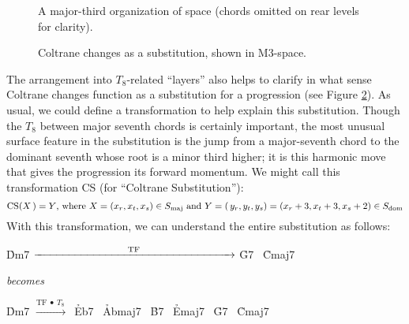 \begin{figure}[tbp]
  \caption[A major-third organization of \tf space.]{A major-third
    organization of \tf space (\ii chords omitted on rear levels for clarity).}
\label{maj3:maj3-space}
\end{figure}

\begin{figure}[tbp]
  \caption{Coltrane changes as a \tfo substitution, shown in M3-space.}
\label{maj3:coltrane-subs-space}
\end{figure}

The arrangement into $T_8$-related ``layers'' also helps to clarify in what
sense Coltrane changes function as a substitution for a \tfo progression
(see Figure \ref{maj3:coltrane-subs-space}). As usual, we could define a
transformation to help explain this substitution. Though the $T_8$ between
major seventh chords is certainly important, the most unusual surface feature
in the substitution is the jump from a major-seventh chord to the dominant
seventh whose root is a minor third higher; it is this harmonic move that
gives the progression its forward momentum. We might call this transformation
CS (for ``Coltrane Substitution''):%
%
\begin{displaymath}
    \mathrm{CS}(X\,) = Y\text{, where}\ X = (x_r, x_t, x_s) \in S_{\mathrm{maj}}
    \text{ and}\
    Y = (\,y_r, y_t, y_s) = (x_r + 3, x_t + 3, x_s + 2) \in S_{\mathrm{dom}}
\end{displaymath}%
%
With this transformation, we can understand the entire \tfo substitution
as follows:%
%
\begin{center}
  \h{Dm7}  $\xrightarrow{\hspace{8.25em}\mathrm{TF}\hspace{8.25em}}$ \h{G7} \TFarrow\ \h{Cmaj7}

  \vspace{.5em}
  \emph{becomes}
  \vspace{.5em}

  \h{Dm7}  $\xrightarrow{\mathrm{TF}\ \bullet\ T_8\,}$\ \h{Eb7} \TFarrow\
  \h{Abmaj7} \CSarrow\ \h{B7} \TFarrow\
  \h{Emaj7}  \CSarrow\ \h{G7} \TFarrow\
  \h{Cmaj7}
\end{center}

